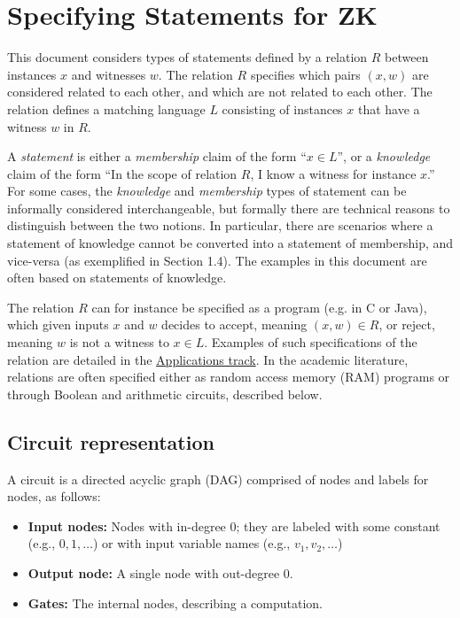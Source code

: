 \section{Specifying Statements for ZK}
\label{security:spec-statements-ZK}

This document considers types of statements defined by a relation $R$ between instances $x$ and witnesses $w$.
The relation $R$ specifies which pairs $(x,w)$ are considered related to each other, and which are not related to each other.
The relation defines a matching language $L$ consisting of instances $x$ that have a witness $w$ in $R$.


A \emph{statement} is either a \emph{membership} claim of the form ``$x \in L$'', or a \emph{knowledge} claim of the form ``In the scope of relation $R$, I know a witness for instance $x$.''
For some cases, the \emph{knowledge} and \emph{membership} types of statement can be informally considered interchangeable, but formally there are technical reasons to distinguish between the two notions. 
In particular, there are scenarios where a statement of knowledge cannot be converted into a statement of membership, and vice-versa (as exemplified in Section 1.4).
The examples in this document are often based on statements of knowledge.
\loosen

 
The relation $R$ can for instance be specified as a program (e.g. in C or Java), which given inputs $x$ and $w$ decides to accept, meaning $(x,w) \in R$, or reject, meaning $w$ is not a witness to $x \in L$. 
Examples of such specifications of the relation are detailed in the \hyperref[chap:apps]{Applications track}.
In the academic literature, relations are often specified either as random access memory (RAM) programs or through Boolean and arithmetic circuits, described below.


\subsection{Circuit representation}
\label{security:spec-statements-ZK:circuit-representation}


A circuit is a directed acyclic graph (DAG) comprised of nodes and labels for nodes, as follows:
\begin{itemize}
\item \textbf{Input nodes:} Nodes with in-degree 0; they are labeled with some constant (e.g., $0, 1, \ldots$) or with input variable names (e.g., $v_1, v_2, \ldots$)
\item \textbf{Output node:} A single node with out-degree 0.
\item \textbf{Gates:} The internal nodes, describing a computation.
\end{itemize}


